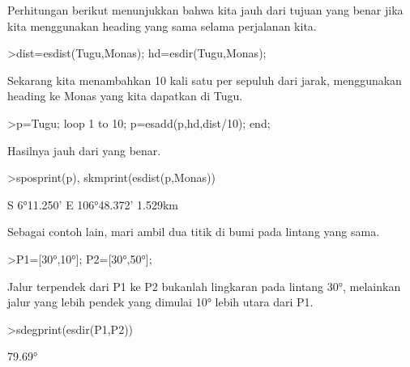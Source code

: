 \documentclass[12pt,arial,letterpaper]{book}
\begin{document}
\begin{eulercomment}
\begin{eulercomment}
\begin{eulercomment}
\begin{eulercomment}
\begin{eulercomment}
\begin{eulercomment}
\begin{eulercomment}
\begin{eulercomment}
\begin{eulercomment}
\begin{eulercomment}
\begin{eulercomment}
\begin{eulercomment}
\begin{eulercomment}
\begin{eulercomment}
\begin{eulercomment}
\begin{eulercomment}
\begin{eulercomment}
\begin{eulercomment}
\begin{eulercomment}
\begin{eulercomment}
\begin{eulercomment}
\begin{eulercomment}
\begin{eulercomment}
\begin{eulercomment}
\begin{eulercomment}
\begin{eulercomment}
\begin{eulercomment}
\begin{eulercomment}
\begin{eulercomment}
\begin{eulercomment}
\begin{eulercomment}
Perhitungan berikut menunjukkan bahwa kita jauh dari tujuan yang benar
jika kita menggunakan heading yang sama selama perjalanan kita.
\end{eulercomment}
\begin{eulerprompt}
>dist=esdist(Tugu,Monas); hd=esdir(Tugu,Monas);
\end{eulerprompt}
\begin{eulercomment}
Sekarang kita menambahkan 10 kali satu per sepuluh dari jarak,
menggunakan heading ke Monas yang kita dapatkan di Tugu.
\end{eulercomment}
\begin{eulerprompt}
>p=Tugu; loop 1 to 10; p=esadd(p,hd,dist/10); end;
\end{eulerprompt}
\begin{eulercomment}
Hasilnya jauh dari yang benar.
\end{eulercomment}
\begin{eulerprompt}
>sposprint(p), skmprint(esdist(p,Monas))
\end{eulerprompt}
\begin{euleroutput}
  S 6°11.250' E 106°48.372'
       1.529km
\end{euleroutput}
\begin{eulercomment}
Sebagai contoh lain, mari ambil dua titik di bumi pada lintang yang
sama.
\end{eulercomment}
\begin{eulerprompt}
>P1=[30°,10°]; P2=[30°,50°];
\end{eulerprompt}
\begin{eulercomment}
Jalur terpendek dari P1 ke P2 bukanlah lingkaran pada lintang 30°,
melainkan jalur yang lebih pendek yang dimulai 10° lebih utara dari
P1.
\end{eulercomment}
\begin{eulerprompt}
>sdegprint(esdir(P1,P2))
\end{eulerprompt}
\begin{euleroutput}
       79.69°
\end{euleroutput}

\end{eulercomment}
\end{eulercomment}
\end{eulercomment}
\end{eulercomment}
\end{eulercomment}
\end{eulercomment}
\end{eulercomment}
\end{eulercomment}
\end{eulercomment}
\end{eulercomment}
\end{eulercomment}
\end{eulercomment}
\end{eulercomment}
\end{eulercomment}
\end{eulercomment}
\end{eulercomment}
\end{eulercomment}
\end{eulercomment}
\end{eulercomment}
\end{eulercomment}
\end{eulercomment}
\end{eulercomment}
\end{eulercomment}
\end{eulercomment}
\end{eulercomment}
\end{eulercomment}
\end{eulercomment}
\end{eulercomment}
\end{eulercomment}
\end{eulercomment}
\end{document}
